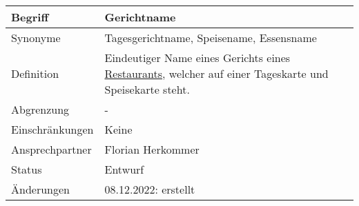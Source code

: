 \begin{table}[H]
    \centering
    \label{gls:gerichtname}
    \begin{tabularx}{\textwidth}{| l | X |}
        \hline
        Begriff         & Gerichtname                                                                                                                       \\
        \hline
        Synonyme        & Tagesgerichtname, Speisename, Essensname                                                                                          \\
        \hline
        Definition      & Eindeutiger Name eines Gerichts eines \hyperref[gls:restaurant]{Restaurants}, welcher auf einer Tageskarte und Speisekarte steht. \\
        \hline
        Abgrenzung      & -                                                                                                                                 \\
        \hline
        Einschränkungen & Keine                                                                                                                             \\
        \hline
        Ansprechpartner & Florian Herkommer                                                                                                                 \\
        \hline
        Status          & Entwurf                                                                                                                           \\
        \hline
        Änderungen      & 08.12.2022: erstellt                                                                                                              \\
        \hline
    \end{tabularx}
\end{table}



